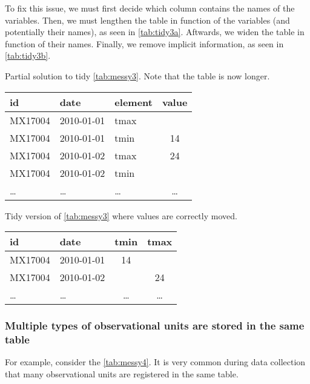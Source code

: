 To fix this issue, we must first decide which column contains the names of the variables.
Then, we must lengthen the table in function of the variables (and potentially their
names), as seen in \cref{tab:tidy3a}.  Aftwards, we widen the table in function of their names.  Finally, we remove
implicit information, as seen in \cref{tab:tidy3b}.

\begin{tablebox}[label=tab:tidy3a]{Partial solution to tidy \cref{tab:messy3}. Note that
  the table is now longer.}
  \centering
  \begin{tabular}{lllc}
    \toprule
    id & date & element & value \\
    \midrule
    MX17004 & 2010-01-01 & tmax &    \\
    MX17004 & 2010-01-01 & tmin & 14 \\
    MX17004 & 2010-01-02 & tmax & 24 \\
    MX17004 & 2010-01-02 & tmin &    \\
    \dots & \dots & \dots & \dots \\
    \bottomrule
  \end{tabular}
\end{tablebox}

\begin{tablebox}[label=tab:tidy3b]{Tidy version of \cref{tab:messy3} where values are correctly moved.}
  \centering
  \begin{tabular}{llcc}
    \toprule
    id & date & tmin & tmax \\
    \midrule
    MX17004 & 2010-01-01 & 14 &    \\
    MX17004 & 2010-01-02 &    & 24 \\
    \dots & \dots & \dots & \dots \\
    \bottomrule
  \end{tabular}
\end{tablebox}


\subsubsection{Multiple types of observational units are stored in the same table}  For
example, consider the \cref{tab:messy4}.  It is very common during data collection that
many observational units are registered in the same table.

